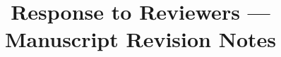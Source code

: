 \documentclass[preprint,12pt]{elsarticle}
\begin{document}
\begin{frontmatter}
\title{Response to Reviewers --- Manuscript Revision Notes}
\end{frontmatter}

%

%
%
%
%
%

%
%
\end{document}

